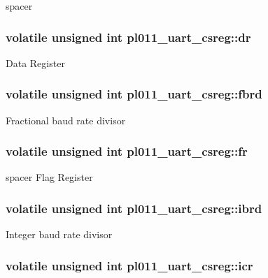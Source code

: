 spacer \hypertarget{structpl011__uart__csreg_a4c66e8d8a321655827c55f283e2f0c5f}{
\subsubsection[{dr}]{\setlength{\rightskip}{0pt plus 5cm}volatile unsigned int pl011\-\_\-uart\-\_\-csreg\-::dr}}\label{structpl011__uart__csreg_a4c66e8d8a321655827c55f283e2f0c5f}
Data Register \hypertarget{structpl011__uart__csreg_a730bd72a53bbd682874cb801cc93f845}{
\subsubsection[{fbrd}]{\setlength{\rightskip}{0pt plus 5cm}volatile unsigned int pl011\-\_\-uart\-\_\-csreg\-::fbrd}}\label{structpl011__uart__csreg_a730bd72a53bbd682874cb801cc93f845}
Fractional baud rate divisor \hypertarget{structpl011__uart__csreg_a2592e71e079472be14149f24be0e7a42}{
\subsubsection[{fr}]{\setlength{\rightskip}{0pt plus 5cm}volatile unsigned int pl011\-\_\-uart\-\_\-csreg\-::fr}}\label{structpl011__uart__csreg_a2592e71e079472be14149f24be0e7a42}
spacer Flag Register \hypertarget{structpl011__uart__csreg_a33c3d060bb12eb191078cd8d69f22cb0}{
\subsubsection[{ibrd}]{\setlength{\rightskip}{0pt plus 5cm}volatile unsigned int pl011\-\_\-uart\-\_\-csreg\-::ibrd}}\label{structpl011__uart__csreg_a33c3d060bb12eb191078cd8d69f22cb0}
Integer baud rate divisor \hypertarget{structpl011__uart__csreg_aa6901cdfcd428738189f34ac3cabb85e}{
\subsubsection[{icr}]{\setlength{\rightskip}{0pt plus 5cm}volatile unsigned int pl011\-\_\-uart\-\_\-csreg\-::icr}}\label{structpl011__uart__csreg_aa6901cdfcd428738189f34ac3cabb85e}
